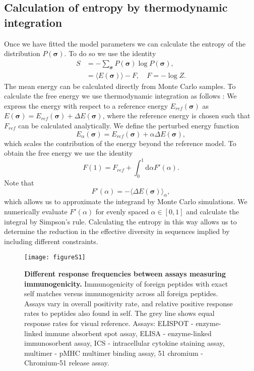 \documentclass[superscriptaddress,twocolumn,pre]{revtex4}
\newcommand{\B}{\boldsymbol}
\newcommand{\ud}{\mathrm{d}}
\newcommand{\<}{\langle}
\renewcommand{\>}{\rangle}
\begin{document}
\subsection{Calculation of entropy by thermodynamic integration}
Once we have fitted the model parameters we can calculate the entropy of the distribution $P(\B \sigma)$. To do so we use the identity
\begin{align}
    S &= - \sum_{\B \sigma}  P(\B \sigma) \log P(\B \sigma),  \\
      &= \langle E(\B \sigma) \rangle - F, \quad F = - \log Z.
\end{align}
The mean energy can be calculated directly from Monte Carlo samples. To calculate the free energy we use thermodynamic integration as follows \cite{Marchi2019b}: We express the energy with respect to a reference energy $E_{ref}(\B \sigma)$ as $E(\B \sigma) = E_{ref}(\B \sigma) + \Delta E(\B\sigma)$, where the reference energy is chosen such that $F_{ref}$ can be calculated analytically. We define the perturbed energy function
\begin{equation}
    E_\alpha(\B \sigma) = E_{ref}(\B \sigma) + \alpha \Delta E(\B\sigma),
\end{equation}
which scales the contribution of the energy beyond the reference model.
To obtain the free energy we use the identity
\begin{equation}
    F(1) = F_{ref} + \int_0^1 \ud \alpha F'(\alpha).
\end{equation}
Note that
\begin{equation}
    F'(\alpha) = - \langle \Delta E(\B \sigma) \rangle_{\alpha},
\end{equation}
which allows us to approximate the integrand by Monte Carlo simulations. We numerically evaluate $F'(\alpha)$ for evenly spaced $\alpha \in [0, 1]$ and calculate the integral by Simpson's rule. Calculating the entropy in this way allows us to determine the reduction in the effective diversity in sequences implied by including different constraints. 

\clearpage

\begin{figure}
     \texttt{[image: figureS1]}
     \caption{
         {\bf Different response frequencies between assays measuring immunogenicity.}
         Immunogenicity of foreign peptides with exact self matches versus immunogenicity across all foreign peptides. Assays vary in overall positivity rate, and relative positive response rates to peptides also found in self. The grey line shows equal response rates for visual reference. Assays: ELISPOT - enzyme-linked immune absorbent spot assay, ELISA - enzyme-linked immunosorbent assay, ICS - intracellular cytokine staining assay, multimer - pMHC multimer binding assay, 51 chromium - Chromium-51 release assay.
     \label{figureS1}
     }
\end{figure}
\end{document}
